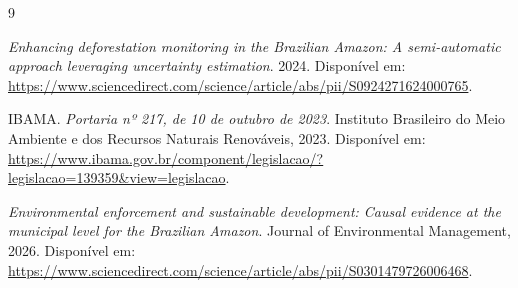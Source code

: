 \documentclass[12pt,a4paper]{article}
\begin{document}
\begin{thebibliography}{9}

\textit{Enhancing deforestation monitoring in the Brazilian Amazon: A semi-automatic approach leveraging uncertainty estimation}.
2024.
Disponível em:
\url{https://www.sciencedirect.com/science/article/abs/pii/S0924271624000765}.

IBAMA.
\textit{Portaria nº 217, de 10 de outubro de 2023}.
Instituto Brasileiro do Meio Ambiente e dos Recursos Naturais Renováveis, 2023.
Disponível em:
\url{https://www.ibama.gov.br/component/legislacao/?legislacao=139359\&view=legislacao}.

\textit{Environmental enforcement and sustainable development: Causal evidence at the municipal level for the Brazilian Amazon}.
Journal of Environmental Management, 2026.
Disponível em:
\url{https://www.sciencedirect.com/science/article/abs/pii/S0301479726006468}.

\end{thebibliography}
\end{document}
